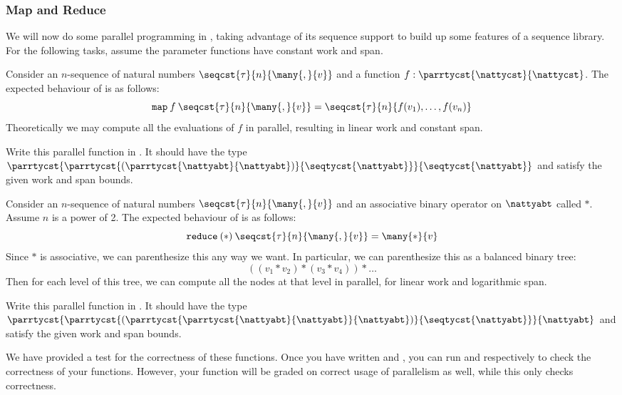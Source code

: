 \subsubsection{Map and Reduce}

We will now do some parallel programming in \LangPPCF{}, taking advantage of its sequence support
to build up some features of a sequence library.
For the following tasks, assume the parameter functions have constant work and span.

Consider an $n$-sequence of natural numbers $\seqcst{\tau}{n}{\many{,}{v}}$ and a function $f : \parrtycst{\nattycst}{\nattycst}$.
The expected behaviour of  is as follows:
%
\[\texttt{map}\:f\:\seqcst{\tau}{n}{\many{,}{v}} = \seqcst{\tau}{n}{f(v_1),\ldots,f(v_n)} \]
%
Theoretically we may compute all the evaluations of $f$ in parallel, resulting in linear work and
constant span.

 Write this parallel  function in .
It should have the type
$\parrtycst{\parrtycst{(\parrtycst{\nattyabt}{\nattyabt})}
                      {\seqtycst{\nattyabt}}}
           {\seqtycst{\nattyabt}}$ and satisfy the given work and span bounds.

Consider an $n$-sequence of natural numbers $\seqcst{\tau}{n}{\many{,}{v}}$ and an associative binary
operator on $\nattyabt$ called $*$. Assume $n$ is a power of 2.
The expected behaviour of  is as follows:
%
\[\texttt{reduce}\:(*)\:\seqcst{\tau}{n}{\many{,}{v}} = \many{*}{v} \]
%
Since $*$ is associative, we can parenthesize this any way we want.
In particular, we can parenthesize this as a balanced binary tree:
\[((v_1 * v_2) * (v_3 * v_4)) * \ldots\]
Then for each level of this tree, we can compute all the nodes at that level in
parallel, for linear work and logarithmic span.

 Write this parallel  function in .
It should have the type
$\parrtycst{\parrtycst{(\parrtycst{\parrtycst{\nattyabt}{\nattyabt}}{\nattyabt})}
                      {\seqtycst{\nattyabt}}}
           {\nattyabt}$ and satisfy the given work and span bounds.

We have provided a test for the correctness of these functions. Once you have written
 and , you can run 
and  respectively to check the correctness
of your functions. However, your function will be graded on correct usage of parallelism as well,
while this only checks correctness.